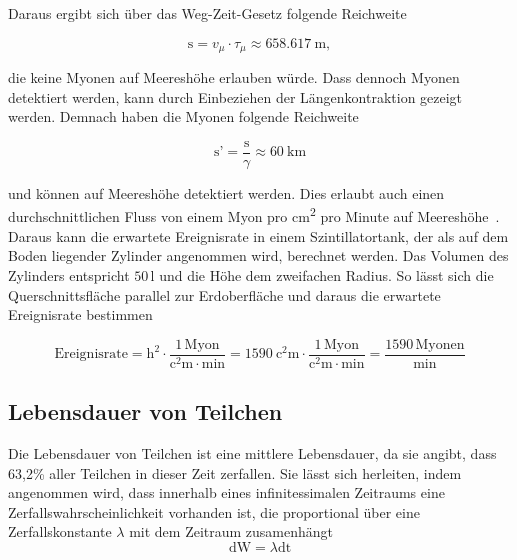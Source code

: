         Daraus ergibt sich über das Weg-Zeit-Gesetz folgende Reichweite

        \begin{equation*}
            \text{s} = v_{\mu} \cdot \tau_{\mu} \approx \SI{658.617}{\metre},
        \end{equation*}

        die keine Myonen auf Meereshöhe erlauben würde. Dass dennoch Myonen detektiert werden, kann durch Einbeziehen der Längenkontraktion gezeigt werden. Demnach haben die Myonen folgende Reichweite

        \begin{equation*}
            \text{s’} = \frac{\text{s}}{\gamma} \approx \SI{60}{\kilo\metre}
        \end{equation*}

        und können auf Meereshöhe detektiert werden. Dies erlaubt auch einen durchschnittlichen Fluss von einem Myon pro \si{\square\centi\metre} pro Minute auf Meereshöhe~\cite{grupen_einstieg_2018}. Daraus kann die erwartete Ereignisrate in einem Szintillatortank, der als auf dem Boden liegender Zylinder angenommen wird, berechnet werden. Das Volumen des Zylinders entspricht $50\,$l und die Höhe dem zweifachen Radius. So lässt sich die Querschnittsfläche parallel zur Erdoberfläche und daraus die erwartete Ereignisrate bestimmen
        
        \begin{equation*}
            \text{Ereignisrate} = \text{h}^2 \cdot \frac{1 \, \text{Myon}}{\si{\square\centi\metre} \cdot \si{\minute}} = \SI{1590}{\square\centi\metre} \cdot \frac{1 \, \text{Myon}}{\si{\square\centi\metre} \cdot \si{\minute}} = \frac{1590 \, \text{Myonen}}{\si{\minute}}
        \end{equation*}

    \subsection{Lebensdauer von Teilchen}
        Die Lebensdauer von Teilchen ist eine mittlere Lebensdauer, da sie angibt, dass 63,2\% aller Teilchen in dieser Zeit zerfallen. Sie lässt sich herleiten, indem angenommen wird, dass innerhalb
        eines infinitessimalen Zeitraums eine Zerfallswahrscheinlichkeit vorhanden ist, die proportional über eine Zerfallskonstante $\lambda$ mit dem Zeitraum zusamenhängt
        \begin{equation}
            \text{dW} = \lambda \text{dt}
            \label{eqn:dW}
        \end{equation}

